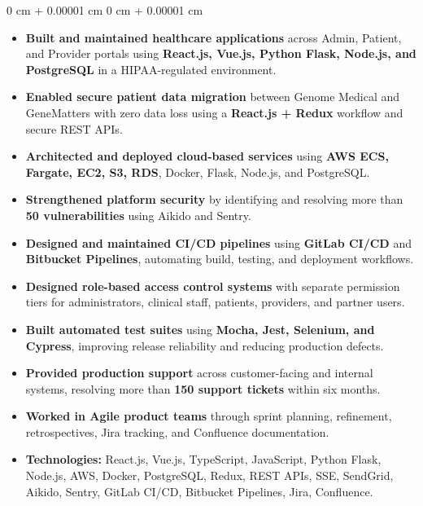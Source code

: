 \documentclass[10pt, letterpaper]{article}
\newenvironment{highlights}{
    \begin{itemize}[
        topsep=0.10 cm,
        parsep=0.10 cm,
        partopsep=0pt,
        itemsep=0pt,
        leftmargin=0 cm + 10pt
    ]
}{
    \end{itemize}
}
\newenvironment{onecolentry}{
    \begin{adjustwidth}{
        0 cm + 0.00001 cm
    }{
        0 cm + 0.00001 cm
    }
}{
    \end{adjustwidth}
}
\begin{document}
\begin{onecolentry}
\begin{highlights}

\item \textbf{Built and maintained healthcare applications} across Admin, Patient, and Provider portals using \textbf{React.js, Vue.js, Python Flask, Node.js, and PostgreSQL} in a HIPAA-regulated environment.

\item \textbf{Enabled secure patient data migration} between Genome Medical and GeneMatters with zero data loss using a \textbf{React.js + Redux} workflow and secure REST APIs.

\item \textbf{Architected and deployed cloud-based services} using \textbf{AWS ECS, Fargate, EC2, S3, RDS}, Docker, Flask, Node.js, and PostgreSQL.

\item \textbf{Strengthened platform security} by identifying and resolving more than \textbf{50 vulnerabilities} using Aikido and Sentry.

\item \textbf{Designed and maintained CI/CD pipelines} using \textbf{GitLab CI/CD} and \textbf{Bitbucket Pipelines}, automating build, testing, and deployment workflows.

\item \textbf{Designed role-based access control systems} with separate permission tiers for administrators, clinical staff, patients, providers, and partner users.

\item \textbf{Built automated test suites} using \textbf{Mocha, Jest, Selenium, and Cypress}, improving release reliability and reducing production defects.

\item \textbf{Provided production support} across customer-facing and internal systems, resolving more than \textbf{150 support tickets} within six months.

\item \textbf{Worked in Agile product teams} through sprint planning, refinement, retrospectives, Jira tracking, and Confluence documentation.

\item \textbf{Technologies:} React.js, Vue.js, TypeScript, JavaScript, Python Flask, Node.js, AWS, Docker, PostgreSQL, Redux, REST APIs, SSE, SendGrid, Aikido, Sentry, GitLab CI/CD, Bitbucket Pipelines, Jira, Confluence.

\end{highlights}
\end{onecolentry}
\end{document}
